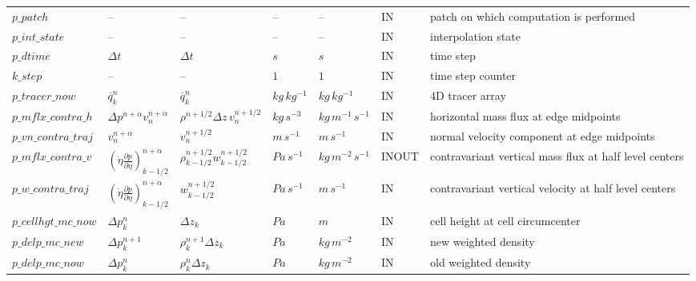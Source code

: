 \begin{landscape}
\begin{singlespacing}
\begin{longtable}{p{2.9cm}|x{2.3cm}|x{2.3cm}|x{1.9cm}|x{1.9cm}|x{2.2cm}|p{8.2cm}}
$p\_patch$              &   --                            &   --                          &  --             &  --                   &  IN       &  patch on which computation is performed\\
$p\_int\_state$         &   --                            &   --                          &  --             &  --                   &  IN       &  interpolation state\\
$p\_dtime$              &  $\Delta t$                     &  $\Delta t$                   &  $s$            &  $s$                  &  IN       &  time step\\
$k\_step$               &  --                             &  --                           &  $1$            &  $1$                  &  IN       &  time step counter\\
$p\_tracer\_now$        &  $\overline{q}^{n}_{k}$         &  $\overline{q}^{n}_{k}$       &  $kg\,kg^{-1}$  &  $kg\,kg^{-1}$        &  IN       &  4D tracer array\\
$p\_mflx\_contra\_h$    &  $\Delta p^{n+\alpha} v_{n}^{n+\alpha}$&  $\rho^{n+1/2}\Delta z\, v_{n}^{n+1/2}$ & $kg\,s^{-3}$&  $kg\,m^{-1}\,s^{-1}$&  IN&  horizontal mass flux at edge midpoints\\
$p\_vn\_contra\_traj$   &  $v_{n}^{n+\alpha}$             &  $v_{n}^{n+1/2}$              &  $m\,s^{-1}$    &  $m\,s^{-1}$          &  IN       &  normal velocity component at edge midpoints\\
$p\_mflx\_contra\_v$    &  $(\dot{\eta}\frac{\partial p}{\partial \eta})^{n+\alpha}_{k-1/2}$&  $\rho^{n+1/2}_{k-1/2}w^{n+1/2}_{k-1/2}$&  $Pa\,s^{-1}$&   $kg\,m^{-2}\,s^{-1}$&  INOUT &  contravariant vertical mass flux at half level centers\\
$p\_w\_contra\_traj$    &  $(\dot{\eta}\frac{\partial p}{\partial \eta})^{n+\alpha}_{k-1/2}$&  $w^{n+1/2}_{k-1/2}$&   $Pa\,s^{-1}$  &  $m\,s^{-1}$&  IN&  contravariant vertical velocity at half level centers\\
$p\_cellhgt\_mc\_now$   &  $\Delta p^{n}_{k}$             &  $\Delta z_{k}$               &  $Pa$           &  $m$                  &  IN       &  cell height at cell circumcenter\\
$p\_delp\_mc\_new$      &  $\Delta p^{n+1}_{k}$           &  $\rho^{n+1}_{k}\Delta z_{k}$ &  $Pa$           &  $kg\,m^{-2}$         &  IN       &  new weighted density \\
$p\_delp\_mc\_now$      &  $\Delta p^{n}_{k}$             &  $\rho^{n}_{k}\Delta z_{k}$   &  $Pa$           &  $kg\,m^{-2}$         &  IN       &  old weighted density\\

\end{longtable}
\end{singlespacing}
\end{landscape}

